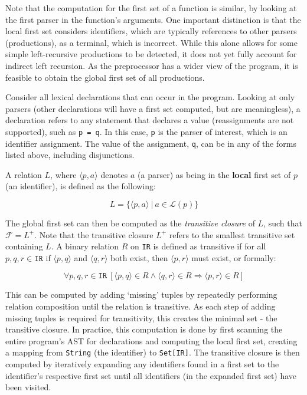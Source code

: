 Note that the computation for the first set of a function is similar, by looking at the first parser in the function's arguments.
One important distinction is that the local first set considers identifiers, which are typically references to other parsers (productions), as a terminal, which is incorrect.
While this alone allows for some simple left-recursive productions to be detected, it does not yet fully account for indirect left recursion.
As the preprocessor has a wider view of the program, it is feasible to obtain the global first set of all productions.

Consider all lexical declarations that can occur in the program.
Looking at only parsers (other declarations will have a first set computed, but are meaningless), a declaration refers to any statement that declares a value (reassignments are not supported), such as \texttt{p = q}.
In this case, \texttt{p} is the parser of interest, which is an identifier assignment.
The value of the assignment, \texttt{q}, can be in any of the forms listed above, including disjunctions.

A relation $L$, where $\langle p, a \rangle$ denotes $a$ (a parser) as being in the \textbf{local} first set of $p$ (an identifier), is defined as the following:

$$L = \{ \langle p, a \rangle\ |\ a \in \mathcal{L}(p) \}$$

The global first set can then be computed as the \emph{transitive closure} of $L$, such that $\mathcal{F} = L^+$.
Note that the transitive closure $L^+$ refers to the smallest transitive set containing $L$.
A binary relation $R$ on \texttt{IR} is defined as transitive if for all $p, q, r \in \texttt{IR}$ if $\langle p, q \rangle$ and $\langle q, r \rangle$ both exist, then $\langle p, r \rangle$ must exist, or formally:

$$\forall p, q, r \in \texttt{IR}\ [\langle p, q \rangle \in R \land \langle q, r \rangle \in R \Rightarrow \langle p, r \rangle \in R]$$

This can be computed by adding `missing' tuples by repeatedly performing relation composition until the relation is transitive.
As each step of adding missing tuples is required for transitivity, this creates the minimal set - the transitive closure.
In practice, this computation is done by first scanning the entire program's AST for declarations and computing the local first set, creating a mapping from \texttt{String} (the identifier) to \texttt{Set[IR]}.
The transitive closure is then computed by iteratively expanding any identifiers found in a first set to the identifier's respective first set until all identifiers (in the expanded first set) have been visited.

